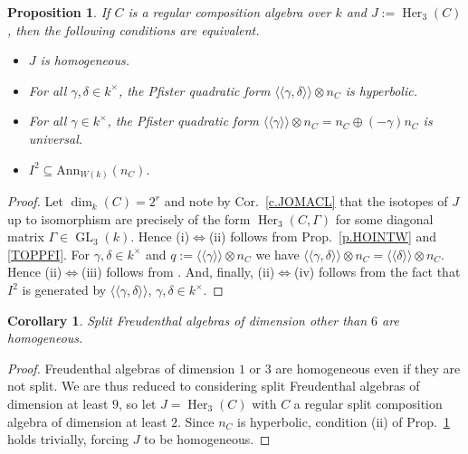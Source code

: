 \documentclass{amsart}
\newtheorem{cor}[equation]{Corollary}
\newtheorem{prop}[equation]{Proposition}
\theoremstyle{definition} %
\theoremstyle{remark} %
\newcommand{\dla}{\langle\langle}
\newcommand{\dra}{\rangle\rangle}
\renewcommand{\:}{\colon\,}
\DeclareMathOperator{\Her}{Her}
\DeclareMathOperator{\GL}{GL}
\numberwithin{equation}{section}
\begin{document}
\begin{prop} \label{p.redfr}
If $C$ is a regular composition algebra over $k$ and $J := \Her_3(C)$, then the following conditions are equivalent.
\begin{itemize}
\item [(i)] $J$ is homogeneous.

\item [(ii)] For all $\gamma,\delta \in k^\times$, the Pfister quadratic form $\langle\langle\gamma,\delta\rangle\rangle \otimes n_C$ is hyperbolic.

\item [(iii)] For all $\gamma\in k^\times$, the Pfister quadratic form $\dla \gamma\dra \otimes n_C = n_C \oplus (-\gamma)n_C$ is universal.

\item[(iv)] $I^2 \subseteq \mathrm{Ann}_{W(k)}(n_C)$.
\end{itemize}
\end{prop}

\begin{proof}
Let $\dim_k(C) = 2^r$ and note by Cor.~\ref{c.JOMACL} that the isotopes of $J$ up to isomorphism are precisely of the form $\Her_3(C,\Gamma)$ for some diagonal matrix $\Gamma \in \GL_3(k)$. Hence (i)$\Leftrightarrow$(ii) follows from Prop.~\ref{p.HOINTW} and \eqref{TOPPFI}. For $\gamma,\delta \in k^\times$ and $q := \dla\gamma\dra \otimes n_C$ we have $\dla\gamma,\delta\dra \otimes n_C = \dla\delta\dra \otimes n_C$. Hence (ii)$\Leftrightarrow$(iii) follows from \cite[Prop.~9.8]{MR2427530}. And, finally, (ii)$\Leftrightarrow$(iv) follows from the fact that $I^2$ is generated by $\dla\gamma,\delta\dra$, $\gamma,\delta \in k^\times$.
\end{proof}

\begin{cor} \label{c.FREHOM}
Split Freudenthal algebras of dimension other than $6$ are homogeneous.    
\end{cor}

\begin{proof}
Freudenthal algebras  of dimension $1$ or $3$ are homogeneous even if they are not split. We are thus reduced to considering split Freudenthal algebras of dimension at least $9$, so let $J = \Her_3(C)$ with $C$ a regular split composition algebra of dimension at least $2$. Since $n_C$ is hyperbolic, condition (ii) of Prop.~\ref{p.redfr} holds trivially, forcing $J$ to be homogeneous. 
\end{proof}
\end{document}
